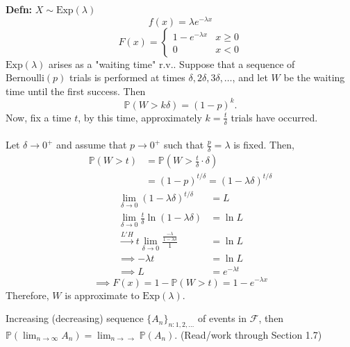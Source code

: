 \documentclass[a4paper]{article}
\newcommand{\n}{\hfill\break}
\newcommand{\defn}[1]{\par\noindent\settowidth{\hangindent}{\textbf{Defn: }}\textbf{Defn: }#1\n}
\newcommand{\F}{\mathcal F}
\newcommand{\Prob}{\mathbb{P}}
\renewcommand{\P}{\Prob}
\begin{document}
\defn{$X\sim\text{Exp}(\lambda)$
\[f(x)=\lambda e^{-\lambda x}\]
\[F(x)=\left\{\begin{array}{lc}1-e^{-\lambda x}&x\geq0\\0&x< 0\end{array}\right.\]
$\text{Exp}(\lambda)$ arises as a "waiting time" r.v.. Suppose that a sequence of $\text{Bernoulli}(p)$ trials is performed at times $\delta, 2\delta, 3\delta, \dots$, and let $W$ be the waiting time until the first success. Then
\[\P(W>k\delta)=(1-p)^k.\]
Now, fix a time $t$, by this time, approximately $k=\frac{t}{\delta}$ trials have occurred. 
\\\\
Let $\delta\rightarrow0^+$ and assume that $p\rightarrow0^+$ such that $\frac{p}{\delta}=\lambda$ is fixed. Then,
\begin{align*}
    \P(W>t)&=\P(W>\frac{t}{\delta}\cdot\delta) \\
    &=(1-p)^{t/\delta}=(1-\lambda\delta)^{t/\delta}
\end{align*}
\begin{align*}
    \lim_{\delta\rightarrow0}(1-\lambda\delta)^{t/\delta}&=L \\
    \lim_{\delta\rightarrow0}\frac{t}{\delta}\ln(1-\lambda\delta)&=\ln{L} \\
    \xrightarrow{L' H} t\lim_{\delta\rightarrow0}\frac{\frac{-\lambda}{1-\lambda\delta}}{1}&=\ln{L} \\
    \implies -\lambda t&=\ln{L} \\
    \implies L&=e^{-\lambda t}
\end{align*}
\[\implies F(x)=1-\P(W>t)=1-e^{-\lambda x}\]
Therefore, $W$ is approximate to $\text{Exp}(\lambda)$.
}

Increasing (decreasing) sequence $\{A_n\}_{n:1,2,\dots}$ of events in $\F$, then $\P(\lim_{n\rightarrow\infty}A_n)=\lim_{n\rightarrow\rightarrow}\P(A_n)$. (Read/work through Section 1.7)
\end{document}
